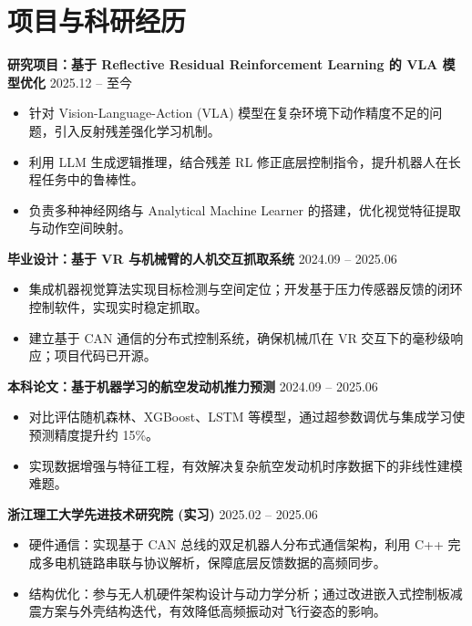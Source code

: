 \documentclass[a4paper,10pt]{article}
\begin{document}
\section*{项目与科研经历}
\noindent
\textbf{研究项目：基于 Reflective Residual Reinforcement Learning 的 VLA 模型优化} \hfill 2025.12 -- 至今
\vspace{0.3em} 
\begin{itemize}[nosep, leftmargin=*]
    \item 针对 Vision-Language-Action (VLA) 模型在复杂环境下动作精度不足的问题，引入反射残差强化学习机制。
    \item 利用 LLM 生成逻辑推理，结合残差 RL 修正底层控制指令，提升机器人在长程任务中的鲁棒性。
    \item 负责多种神经网络与 Analytical Machine Learner 的搭建，优化视觉特征提取与动作空间映射。
\end{itemize}
\vspace{0.5em}
\noindent
\textbf{毕业设计：基于 VR 与机械臂的人机交互抓取系统} \hfill 2024.09 -- 2025.06 \\
\vspace{-1.2em} 
\begin{itemize}[nosep, leftmargin=*]
    \item 集成机器视觉算法实现目标检测与空间定位；开发基于压力传感器反馈的闭环控制软件，实现实时稳定抓取。
    \item 建立基于 CAN 通信的分布式控制系统，确保机械爪在 VR 交互下的毫秒级响应；项目代码已开源。
\end{itemize}
\vspace{0.5em}
\noindent
\textbf{本科论文：基于机器学习的航空发动机推力预测} \hfill 2024.09 -- 2025.06 \\
\vspace{-1.2em} 
\begin{itemize}
    \item 对比评估随机森林、XGBoost、LSTM 等模型，通过超参数调优与集成学习使预测精度提升约 15\%。
    \item 实现数据增强与特征工程，有效解决复杂航空发动机时序数据下的非线性建模难题。
\end{itemize}
\vspace{0.5em}
\noindent
\textbf{浙江理工大学先进技术研究院 (实习)} \hfill 2025.02 -- 2025.06 \\
\vspace{-1.2em} 
\begin{itemize}
    \item 硬件通信：实现基于 CAN 总线的双足机器人分布式通信架构，利用 C++ 完成多电机链路串联与协议解析，保障底层反馈数据的高频同步。
    \item 结构优化：参与无人机硬件架构设计与动力学分析；通过改进嵌入式控制板减震方案与外壳结构迭代，有效降低高频振动对飞行姿态的影响。
\end{itemize}
\end{document}
